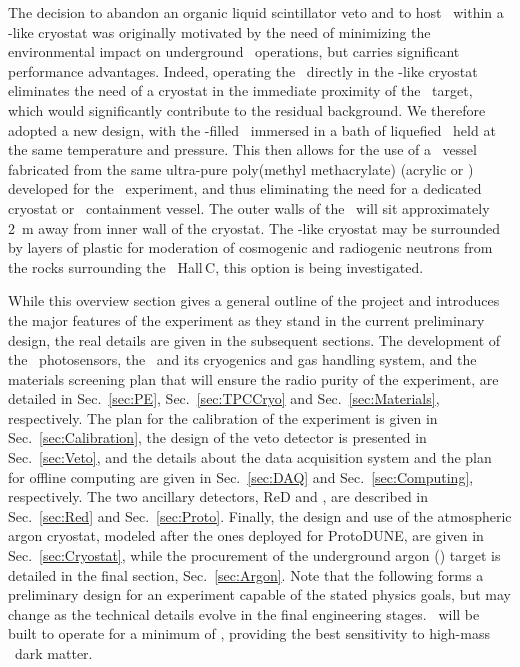 The decision to abandon an organic liquid scintillator veto and to host \DSks\ within a \pDUNE-like cryostat was originally motivated by the need of minimizing the environmental impact on underground \LNGS\ operations, but carries significant performance advantages.  Indeed, operating the \TPC\ directly in the \pDUNE-like cryostat eliminates the need of a cryostat in the immediate proximity of the \UAr\ target, which would significantly contribute to the residual background.  We therefore adopted a new design, with the \UAr-filled \TPC\  immersed in a bath of liquefied \AAr\ held at the same temperature and pressure.  This then allows for the use of a \TPC\ vessel fabricated from the same ultra-pure poly(methyl methacrylate) (acrylic or \PMMA) developed for the \DEAP\ experiment, and thus eliminating the need for a dedicated cryostat or \UAr\ containment vessel.  The outer walls of the \TPC\ will sit approximately \SI{2}{\m} away from inner wall of the cryostat.  The \pDUNE-like cryostat may be surrounded by layers of plastic for moderation of cosmogenic and radiogenic neutrons from the rocks surrounding the \LNGS\ Hall\,C, this option is being investigated.

While this overview section gives a general outline of the project and introduces the major features of the experiment as they stand in the current preliminary design, the real details are given in the subsequent sections. The development of the \SiPM\ photosensors, the \LArTPC\ and its cryogenics and gas handling system, and the materials screening plan that will ensure the radio purity of the experiment, are detailed in Sec.~\ref{sec:PE}, Sec.~\ref{sec:TPCCryo} and Sec.~\ref{sec:Materials}, respectively.  The plan for the calibration of the experiment is given in Sec.~\ref{sec:Calibration}, the design of the veto detector is presented in Sec.~\ref{sec:Veto}, and the details about the data acquisition system and the plan for offline computing are given in Sec.~\ref{sec:DAQ} and Sec.~\ref{sec:Computing}, respectively.  The two ancillary detectors, ReD and \DSp, are described in Sec.~\ref{sec:Red} and Sec.~\ref{sec:Proto}.  Finally, the design and use of the atmospheric argon cryostat, modeled after the ones deployed for ProtoDUNE, are given in Sec.~\ref{sec:Cryostat}, while the procurement of the underground argon (\UAr) target is detailed in the final section, Sec.~\ref{sec:Argon}.  Note that the following forms a preliminary design for an experiment capable of the stated physics goals, but may change as the technical details evolve in the final engineering stages.  \DSks\ will be built to operate for a minimum of \DSkExtendedRunTimePlanned, providing the best sensitivity to high-mass \WIMP\ dark matter.


